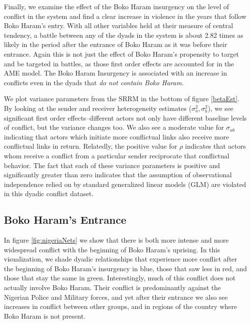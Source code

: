 Finally, we examine the effect of the Boko Haram insurgency on the level of conflict in the system and find a clear increase in violence in the years that follow Boko Haram's entry. With all other variables held at their measure of central tendency, a battle between any of the dyads in the system is about 2.82 times as likely in the period after the entrance of Boko Haram as it was before their entrance. Again this is not just the effect of Boko Haram's propensity to target and be targeted in battles, as those first order effects are accounted for in the AME model. The Boko Haram Insurgency is associated with an increase in conflicts even in the dyads that \emph{do not contain Boko Haram}.

We plot variance parameters from the SRRM in the bottom of figure \ref{betaEst}. By looking at the sender and receiver heterogeneity estimates ($\sigma^{2}_{a}, \sigma^{2}_{b}$), we see significant first order effects--different actors not only have different baseline levels of conflict, but the variance changes too. We also see a moderate value for $\sigma_{ab}$ indicating that actors which initiate more conflictual links also receive more conflictual links in return. Relatedly, the positive value for $\rho$ indicates that actors whom receive a conflict from a particular sender reciprocate that conflictual behavior. The fact that each of these variance parameters is positive and significantly greater than zero indicates that the assumption of observational independence relied on by standard generalized linear models (GLM) are violated in this dyadic conflict dataset.

\subsection*{Boko Haram's Entrance}

In figure \ref{fig:nigeriaNets} we show that there is both more intense and more widespread conflict with the beginning of Boko Haram's uprising. In this visualization, we shade dyadic relationships that experience more conflict after the beginning of Boko Haram's insurgency in blue, those that saw less in red, and those that stay the same in green. Interestingly, much of this conflict does not actually involve Boko Haram. Their conflict is predominantly against the Nigerian Police and Military forces, and yet after their entrance we also see increases in conflict between other groups, and in regions of the country where Boko Haram is not present.

